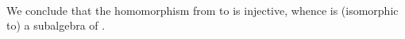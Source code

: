 \begin{code}
\AgdaSpace{}%
\AgdaSpace{}%
\AgdaSpace{}%
\<%
\\
%
\>[3]%
\>[9]\AgdaSymbol{=}\AgdaSpace{}%
\AgdaSpace{}%
\AgdaSymbol{(}\AgdaSymbol{\{}\AgdaSpace{}%
\AgdaSymbol{=}\AgdaSpace{}%
\AgdaSpace{}%
\AgdaSpace{}%
\AgdaSymbol{\}(}\AgdaSpace{}%
\AgdaSpace{}%
\AgdaSpace{}%
\AgdaSymbol{)}\AgdaSpace{}%
\AgdaSymbol{)}\<%
\\
%
\>[9]\AgdaSymbol{(}\AgdaSpace{}%
\AgdaSpace{}%
\AgdaSymbol{(}\AgdaSpace{}%
\AgdaSymbol{)(}\AgdaSpace{}%
\AgdaSymbol{(}\AgdaSymbol{\{}\AgdaSpace{}%
\AgdaSymbol{=}\AgdaSpace{}%
\AgdaSpace{}%
\AgdaSpace{}%
\AgdaSymbol{\}}\AgdaSpace{}%
\AgdaSymbol{(}\AgdaSpace{}%
\AgdaSpace{}%
\AgdaSpace{}%
\AgdaSymbol{)}\AgdaSpace{}%
\AgdaSymbol{)))}\<%
\\
\>[0]\<%
\end{code}
\fi
\noindent We conclude that the homomorphism from  to  is injective, whence  is (isomorphic to) a subalgebra of .

